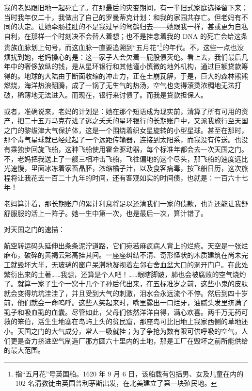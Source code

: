 \documentclass[AutoFakeBold=true]{book}
\begin{document}
我的老妈跟旧地一起死亡了。在那最后的灾变期间，有一半旧式家庭选择留下来；当时我年仅二十，我做出了自己的罗曼蒂克计划：和我的家园共存亡。但老妈有不同的决定。让她牵肠挂肚的不是我过早的驾鹤归去——她跟我一样，甚或更为自私自利，在那样一个时刻决不会替人着想；也不是挂念着我的 DNA 的死亡会给这条贵族血脉划上句号，而这血脉一直要追溯到``五月花''\footnote{指``五月花''号英国船。1620 年 9 月 6 日，该船载有包括男、女及儿童在内的 102 名清教徒由英国普利茅斯出发，在北美建立了第一块殖民地。}的年代。不，这些一点也没烦扰到她，老妈操心的是：这一家子人会欠着一屁股债灭绝。看上去，我们最后几年中的奢侈放纵的钱，是从星环银行和其他谨小慎微的地外机构，通过巨额贷款筹得的。地球的大陆由于断面收缩的冲击力，正在土崩瓦解，于是，巨大的森林熊熊燃烧，海洋热浪翻腾，成了一锅了无生气的热汤，空气也变得滚烫浓稠地无法打破，稀薄地无法进入。而现在，银行来讨债了。而我是贷款担保人。

或者，准确说来，老妈的计划是：她在那个短语成为现实前，清算了所有可用的资产，把二十五万马克存进了逃之夭夭的星环银行的长期账户中，又派我旅行至天国之门的黎绂津大气保护体，这是一个围绕着织女星旋转的小型星球。甚至在那时，那个毒气星球就已经建起了一个远距传输器，连接到太阳系，而我没有传送。也没有乘独步回旋飞船，这种飞船使用霍金驱动器，每个标准年都会去一次天国之门。不，老妈把我送上了一艘三相冲击飞船，飞往偏地的这个尽头，那飞船的速度远比光速慢，里面冰冻着家畜晶胚，浓缩橘子汁，以及食客病毒，按飞船日历，这次旅程将让我花去{\kaishu 一百二十九年}的时间，还有客观如实的时间债，也就是：{\kaishu 一百六十七年}！

老妈算计着，那长期账户的累计利息将足以还清我们一家的债款，也许还能让我舒舒服服的活上一阵子。她一生中第一次，也是最后一次，算计错了。

\vspace*{1em}

对天国之门的速描：

航空转运码头延伸出条条泥泞道路，它们宛若麻疯病人背上的烂疮。天空是一张烂麻布，破碎的黄褐云彩高挂其间。一座座纠结不清、奇形怪状的木质建筑在尚未完工就毁坏大半，无玻璃的窗户呆滞地凝视着左邻右舍血盆大口的洞开门户。在此处繁衍出来的土著……我想，还算是个人吧！……眼瞎脚跛，肺也会被腐败的空气烧灼了。就算一家子生个一窝十几个子孙后代出来，在五标准岁之前，这些小鬼的皮肤就会变得坑坑洼洼了，并且受到大气的刺激，泪水会永远流个不停。然后到四十岁前，他们就会一命呜呼。这些人笑起来时，嘴里露出一口烂牙，油腻头发里挤满了虱子和吸血虱的血囊。尽管如此，父母们依然洋洋自得，满心欢喜。两千万无药可救的笨伯，活生生地塞在岛屿上头的贫民窟，那座岛可比旧地上我家西侧的草地还小。天国之门的大气成分，常人一吸就挂；为了争抢为数有限可供呼吸的空气，人们更是奋力挤进空气制造厂那方圆六十里内的土地，那是工厂在毁坏之前所能供给的最大范围。
\end{document}
